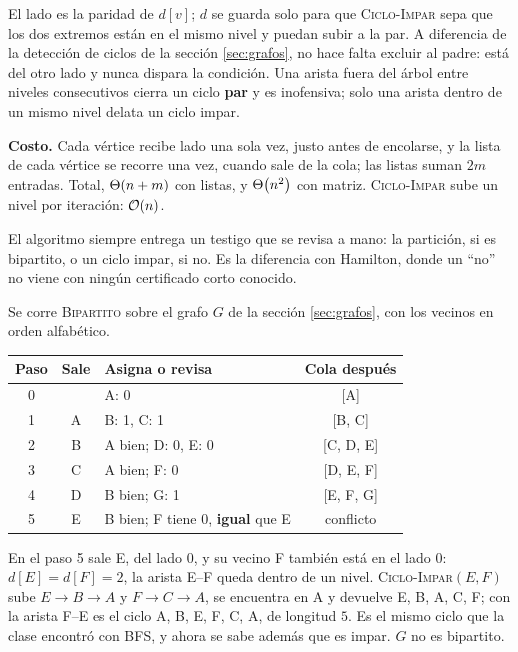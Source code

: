 \documentclass[11pt,letterpaper]{article}
\begin{document}
El lado es la paridad de $d[v]$; $d$ se guarda solo para que
\textsc{Ciclo-Impar} sepa que los dos extremos están en el mismo nivel
y puedan subir a la par. A diferencia de la detección de ciclos de la
sección \ref{sec:grafos}, no hace falta excluir al padre: está del
otro lado y nunca dispara la condición. Una arista fuera del árbol
entre niveles consecutivos cierra un ciclo \textbf{par} y es
inofensiva; solo una arista dentro de un mismo nivel delata un ciclo
impar.

\textbf{Costo.} Cada vértice recibe lado una sola vez, justo antes de
encolarse, y la lista de cada vértice se recorre una vez, cuando sale
de la cola; las listas suman $2m$ entradas. Total, $\Theta\!\left(n + m\right)$ con
listas, y $\Theta\!\left(n^2\right)$ con matriz. \textsc{Ciclo-Impar} sube un nivel
por iteración: $\mathcal{O}\!\left(n\right)$.

\begin{idea}
  El algoritmo siempre entrega un testigo que se revisa a mano: la
  partición, si es bipartito, o un ciclo impar, si no. Es la
  diferencia con Hamilton, donde un ``no'' no viene con ningún
  certificado corto conocido.
\end{idea}

\begin{ejemplo}
  \label{ej:bipartito-traza-G}
  Se corre \textsc{Bipartito} sobre el grafo $G$ de la sección
  \ref{sec:grafos}, con los vecinos en orden alfabético.
  \begin{center}
  \small
  \begin{tabular}{cclc}
    \toprule
    \textbf{Paso} & \textbf{Sale} & \textbf{Asigna o revisa}
      & \textbf{Cola después} \\
    \midrule
    0 & & A: 0 & [A] \\
    1 & A & B: 1, C: 1 & [B, C] \\
    2 & B & A bien; D: 0, E: 0 & [C, D, E] \\
    3 & C & A bien; F: 0 & [D, E, F] \\
    4 & D & B bien; G: 1 & [E, F, G] \\
    5 & E & B bien; F tiene 0, \textbf{igual} que E & conflicto \\
    \bottomrule
  \end{tabular}
  \end{center}
  En el paso 5 sale E, del lado $0$, y su vecino F también está en el
  lado $0$: $d[E] = d[F] = 2$, la arista E--F queda dentro de un
  nivel. \textsc{Ciclo-Impar}$(E, F)$ sube $E \to B \to A$ y
  $F \to C \to A$, se encuentra en A y devuelve E, B, A, C, F; con la
  arista F--E es el ciclo A, B, E, F, C, A, de longitud $5$. Es el
  mismo ciclo que la clase encontró con BFS, y ahora se sabe además
  que es impar. $G$ no es bipartito.
\end{ejemplo}
\end{document}

